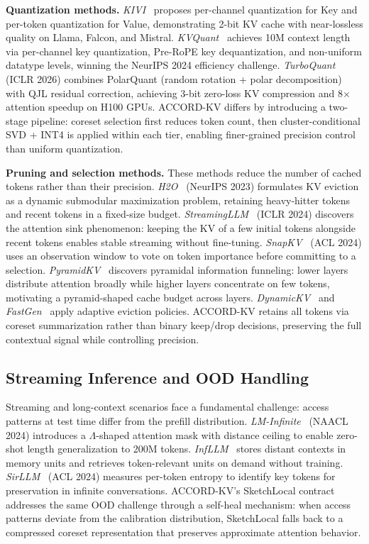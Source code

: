 \documentclass[11pt, a4paper, oneside]{article}
\theoremstyle{myplain}
\theoremstyle{mydefinition}
\theoremstyle{myremark}
\begin{document}
\textbf{Quantization methods.} \textit{KIVI}~\cite{liu2024kivi} proposes per-channel quantization for Key and per-token quantization for Value, demonstrating 2-bit KV cache with near-lossless quality on Llama, Falcon, and Mistral. \textit{KVQuant}~\cite{hooper2024kvquant} achieves 10M context length via per-channel key quantization, Pre-RoPE key dequantization, and non-uniform datatype levels, winning the NeurIPS 2024 efficiency challenge. \textit{TurboQuant}~\cite{zandieh2026turboquant} (ICLR 2026) combines PolarQuant (random rotation + polar decomposition) with QJL residual correction, achieving 3-bit zero-loss KV compression and 8$\times$ attention speedup on H100 GPUs. ACCORD-KV differs by introducing a two-stage pipeline: coreset selection first reduces token count, then cluster-conditional SVD + INT4 is applied within each tier, enabling finer-grained precision control than uniform quantization.

\textbf{Pruning and selection methods.} These methods reduce the number of cached tokens rather than their precision. \textit{H2O}~\cite{zhang2023heavy} (NeurIPS 2023) formulates KV eviction as a dynamic submodular maximization problem, retaining heavy-hitter tokens and recent tokens in a fixed-size budget. \textit{StreamingLLM}~\cite{xiao2024efficient} (ICLR 2024) discovers the attention sink phenomenon: keeping the KV of a few initial tokens alongside recent tokens enables stable streaming without fine-tuning. \textit{SnapKV}~\cite{li2024snapkv} (ACL 2024) uses an observation window to vote on token importance before committing to a selection. \textit{PyramidKV}~\cite{zhang2024pyramidkv} discovers pyramidal information funneling: lower layers distribute attention broadly while higher layers concentrate on few tokens, motivating a pyramid-shaped cache budget across layers. \textit{DynamicKV}~\cite{zhou2024dynamic} and \textit{FastGen}~\cite{ge2024fastgen} apply adaptive eviction policies. ACCORD-KV retains all tokens via coreset summarization rather than binary keep/drop decisions, preserving the full contextual signal while controlling precision.

\subsection{Streaming Inference and OOD Handling}

Streaming and long-context scenarios face a fundamental challenge: access patterns at test time differ from the prefill distribution. \textit{LM-Infinite}~\cite{han2024lminfinite} (NAACL 2024) introduces a $\Lambda$-shaped attention mask with distance ceiling to enable zero-shot length generalization to 200M tokens. \textit{InfLLM}~\cite{xiao2024infllm} stores distant contexts in memory units and retrieves token-relevant units on demand without training. \textit{SirLLM}~\cite{liu2024sirllm} (ACL 2024) measures per-token entropy to identify key tokens for preservation in infinite conversations. ACCORD-KV's SketchLocal contract addresses the same OOD challenge through a self-heal mechanism: when access patterns deviate from the calibration distribution, SketchLocal falls back to a compressed coreset representation that preserves approximate attention behavior.
\end{document}
